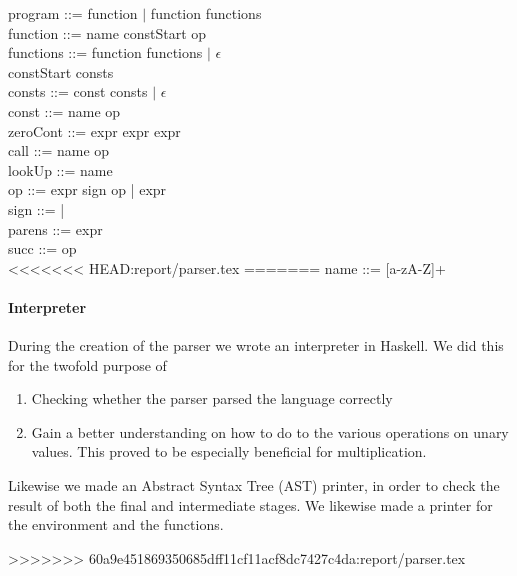 program ::= function $\mid$ function functions\\

function ::= name \bnf{=>} constStart op\\

functions ::= \bnf{,} function functions $\mid$ $\epsilon$\\

constStart \bnf{[} consts \bnf{]}\\

consts ::= const \bnf{,} consts $\mid$ $\epsilon$\\

const ::= name \bnf{=} op\\

zeroCont ::=  \bnf{(} expr \bnf{)} \bnf{\{} expr \bnf{\}}  \bnf{\{} expr \bnf{\}}\\

call ::=  name op\\

lookUp ::=  name\\

op ::= expr sign op | expr\\

sign ::= \bnf{+} | \bnf{*}\\

parens ::=\bnf{(} expr \bnf{)}\\

succ ::=  op\\

<<<<<<< HEAD:report/parser.tex
=======
name ::= [a-zA-Z]+

\paragraph{Interpreter}
During the creation of the parser we wrote an interpreter in Haskell. We did this for the twofold purpose of 
\begin{enumerate}
\item Checking whether the parser parsed the language correctly
\item Gain a better understanding on how to do to the various operations on unary values. This proved to be especially beneficial for multiplication. 
\end{enumerate}
Likewise we made an Abstract Syntax Tree (AST) printer, in order to check the result of both the final and intermediate stages. We likewise made a printer for the environment and the functions.

>>>>>>> 60a9e451869350685dff11cf11acf8dc7427c4da:report/parser.tex
